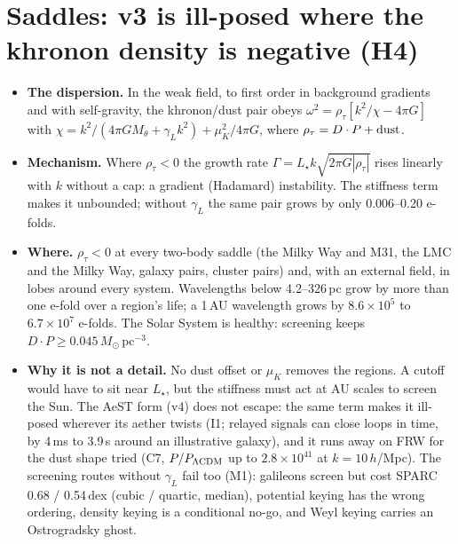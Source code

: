 \documentclass[10pt]{article}
\begin{document}
\section{Saddles: v3 is ill-posed where the khronon density is negative (H4)}
\begin{itemize}
\item \textbf{The dispersion.} In the weak field, to first order in background gradients and with self-gravity, the khronon/dust pair obeys $\omega^2=\rho_\tau[k^2/\chi-4\pi G]$ with $\chi=k^2/(4\pi GM_\theta+\gamma_Lk^2)+\mu_K^2/4\pi G$, where $\rho_\tau=D\cdot P+{\rm dust}$.
\item \textbf{Mechanism.} Where $\rho_\tau<0$ the growth rate $\Gamma=L_\star k\sqrt{2\pi G|\rho_\tau|}$ rises linearly with $k$ without a cap: a gradient (Hadamard) instability. The stiffness term makes it unbounded; without $\gamma_L$ the same pair grows by only 0.006--0.20 e-folds.
\item \textbf{Where.} $\rho_\tau<0$ at every two-body saddle (the Milky Way and M31, the LMC and the Milky Way, galaxy pairs, cluster pairs) and, with an external field, in lobes around every system. Wavelengths below 4.2--326\,pc grow by more than one e-fold over a region's life; a 1\,AU wavelength grows by $8.6\times10^{5}$ to $6.7\times10^{7}$ e-folds. The Solar System is healthy: screening keeps $D\cdot P\ge0.045\,M_\odot$\,pc$^{-3}$.
\item \textbf{Why it is not a detail.} No dust offset or $\mu_K$ removes the regions. A cutoff would have to sit near $L_\star$, but the stiffness must act at AU scales to screen the Sun. The AeST form (v4) does not escape: the same term makes it ill-posed wherever its aether twists (I1; relayed signals can close loops in time, by 4\,ms to 3.9\,s around an illustrative galaxy), and it runs away on FRW for the dust shape tried (C7, $P/P_{\Lambda\rm CDM}$ up to $2.8\times10^{41}$ at $k=10\,h$/Mpc). The screening routes without $\gamma_L$ fail too (M1): galileons screen but cost SPARC 0.68 / 0.54\,dex (cubic / quartic, median), potential keying has the wrong ordering, density keying is a conditional no-go, and Weyl keying carries an Ostrogradsky ghost.
\end{itemize}
\end{document}

